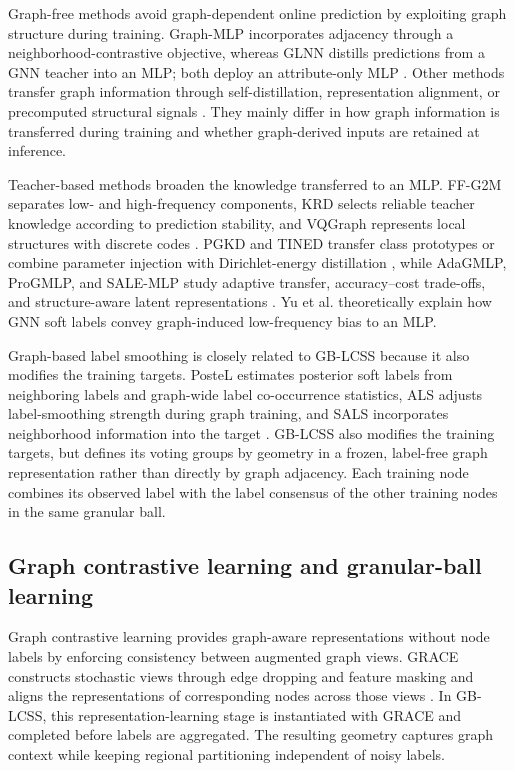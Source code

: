 \documentclass[preprint,12pt]{elsarticle}
\begin{document}
Graph-free methods avoid graph-dependent online prediction by exploiting graph structure during training. Graph-MLP incorporates adjacency through a neighborhood-contrastive objective, whereas GLNN distills predictions from a GNN teacher into an MLP; both deploy an attribute-only MLP \cite{ref3,ref4}. Other methods transfer graph information through self-distillation, representation alignment, or precomputed structural signals \cite{ref5,ref14,ref15,ref27,ref33}. They mainly differ in how graph information is transferred during training and whether graph-derived inputs are retained at inference.

Teacher-based methods broaden the knowledge transferred to an MLP. FF-G2M separates low- and high-frequency components, KRD selects reliable teacher knowledge according to prediction stability, and VQGraph represents local structures with discrete codes \cite{ref6,ref7,ref26}. PGKD and TINED transfer class prototypes or combine parameter injection with Dirichlet-energy distillation \cite{ref28,ref43}, while AdaGMLP, ProGMLP, and SALE-MLP study adaptive transfer, accuracy--cost trade-offs, and structure-aware latent representations \cite{ref29,ref30,ref31}. Yu et al. \cite{ref32} theoretically explain how GNN soft labels convey graph-induced low-frequency bias to an MLP.

Graph-based label smoothing is closely related to GB-LCSS because it also modifies the training targets. PosteL estimates posterior soft labels from neighboring labels and graph-wide label co-occurrence statistics, ALS adjusts label-smoothing strength during graph training, and SALS incorporates neighborhood information into the target \cite{ref60,ref61,ref62}. GB-LCSS also modifies the training targets, but defines its voting groups by geometry in a frozen, label-free graph representation rather than directly by graph adjacency. Each training node combines its observed label with the label consensus of the other training nodes in the same granular ball.

\subsection{Graph contrastive learning and granular-ball learning}\label{sec:2.4}

Graph contrastive learning provides graph-aware representations without node labels by enforcing consistency between augmented graph views. GRACE constructs stochastic views through edge dropping and feature masking and aligns the representations of corresponding nodes across those views \cite{ref16}. In GB-LCSS, this representation-learning stage is instantiated with GRACE and completed before labels are aggregated. The resulting geometry captures graph context while keeping regional partitioning independent of noisy labels.
\end{document}

